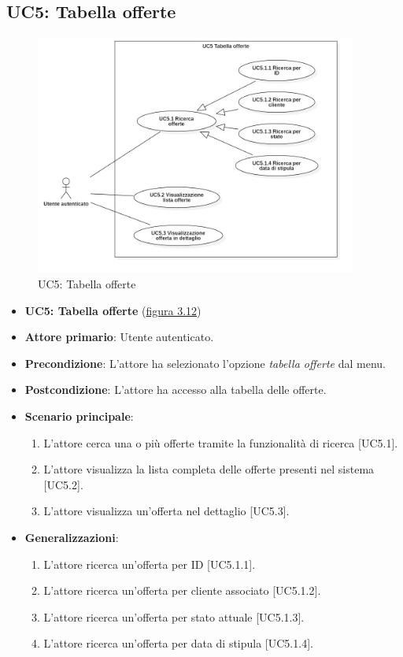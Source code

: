 \subsection{UC5: Tabella offerte}
\begin{figure}[!h]
\centering
\includegraphics[width=400px]{../images/UC/.jpeg/UC5.0-tabellaOfferte.jpg}
\caption{UC5: Tabella offerte}
\label{fig:UC5}
\end{figure}

\begin{itemize}
\item \textbf{UC5: Tabella offerte} ({\hyperref[fig:UC5]{figura 3.12}})
\item \textbf{Attore primario}: Utente autenticato.
\item \textbf{Precondizione}: L'attore ha selezionato l'opzione \textit{tabella offerte} dal menu.
\item \textbf{Postcondizione}: L'attore ha accesso alla tabella delle offerte.
\item \textbf{Scenario principale}: 
\begin{enumerate}
\item L'attore cerca una o più offerte tramite la funzionalità di ricerca [UC5.1].
\item L'attore visualizza la lista completa delle offerte presenti nel sistema [UC5.2].
\item L'attore visualizza un'offerta nel dettaglio [UC5.3].
\end{enumerate}
\item \textbf{Generalizzazioni}:
\begin{enumerate}
\item L'attore ricerca un'offerta per ID [UC5.1.1].
\item L'attore ricerca un'offerta per cliente associato [UC5.1.2].
\item L'attore ricerca un'offerta per stato attuale [UC5.1.3].
\item L'attore ricerca un'offerta per data di stipula [UC5.1.4].
\end{enumerate}
\end{itemize}

